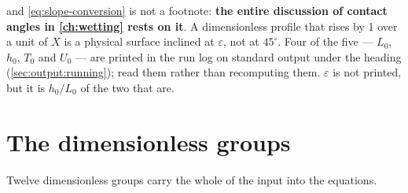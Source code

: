 and \cref{eq:slope-conversion} is not a footnote: \textbf{the entire discussion
of contact angles in \cref{ch:wetting} rests on it}. A dimensionless profile
that rises by 1 over a unit of $X$ is a physical surface inclined at
$\varepsilon$, not at $45^\circ$. Four of the five --- $L_0$, $h_0$, $T_0$ and
$U_0$ --- are printed in the run log on standard output under the heading
 (\cref{sec:output:running}); read them rather than
recomputing them. $\varepsilon$ is not printed, but it is $h_0/L_0$ of the two
that are.

\section{The dimensionless groups}
\label{sec:governing:groups}

Twelve dimensionless groups carry the whole of the input into the equations.

